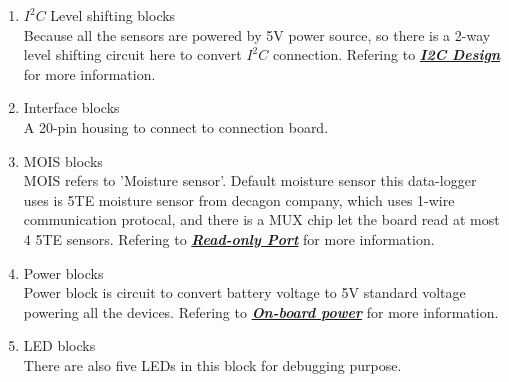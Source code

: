     \begin{enumerate}
    \item $I^{2}C$ Level shifting blocks  \\
      Because all the sensors are powered by 5V power source, so there is a 2-way level shifting circuit here to convert $I^{2}C$ connection. Refering to \hyperref[i2c Design]{\textbf{\textit{I2C Design}}} for more information.
    \item Interface blocks\\
      A 20-pin housing to connect to connection board.
    \item MOIS blocks \\
      MOIS refers to 'Moisture sensor'. Default moisture sensor this data-logger uses is 5TE moisture sensor from decagon company, which uses 1-wire communication protocal, and there is a MUX chip let the board read at most 4 5TE sensors. Refering to \hyperref[read-only Design]{\textbf{\textit{Read-only Port}}} for more information.
    \item Power blocks  \\
      Power block is circuit to convert battery voltage to 5V standard voltage powering all the devices. Refering to \hyperref[power block]{\textbf{\textit{On-board power}}} for more information.
    \item LED blocks    \\
      There are also five LEDs in this block for debugging purpose.
    \end{enumerate}

